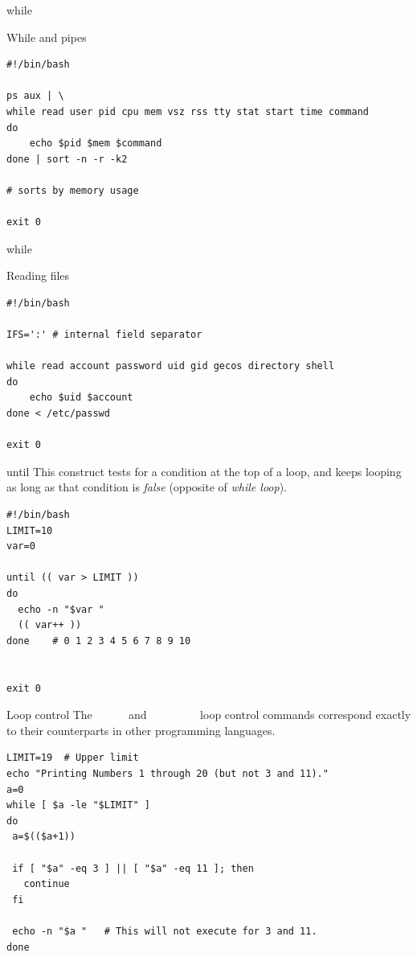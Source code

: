 \documentclass[xcolor=dvipsnames, 10pt, presentation,aspectratio=169]{beamer}
\newcommand{\bashcmd}[1]{\textcolor{White}{\colorbox{Sepia}{\texttt{#1}}}}
\begin{document}
\begin{frame}[label={sec:org631e4e6},fragile]{while}
 \begin{block}{While and pipes}
\begin{verbatim}
#!/bin/bash

ps aux | \
while read user pid cpu mem vsz rss tty stat start time command
do
    echo $pid $mem $command
done | sort -n -r -k2

# sorts by memory usage

exit 0
\end{verbatim}
\end{block}
\end{frame}
\begin{frame}[label={sec:orgd2531e5},fragile]{while}
 \begin{block}{Reading files}
\begin{verbatim}
#!/bin/bash

IFS=':' # internal field separator

while read account password uid gid gecos directory shell
do
    echo $uid $account
done < /etc/passwd

exit 0
\end{verbatim}
\end{block}
\end{frame}
\begin{frame}[label={sec:org83d089f},fragile]{until}
 This construct tests for a condition at the top of a loop, and keeps
looping as long as that condition is \emph{false} (opposite of \emph{while loop}).
\begin{block}{}
\begin{verbatim}
#!/bin/bash
LIMIT=10
var=0

until (( var > LIMIT ))
do
  echo -n "$var "
  (( var++ ))
done    # 0 1 2 3 4 5 6 7 8 9 10 


exit 0
\end{verbatim}
\end{block}
\end{frame}
\begin{frame}[label={sec:orgcaa410f},fragile]{Loop control}
 The \bashcmd{break} and \bashcmd{continue} loop control commands
correspond exactly to their counterparts in other programming
languages.
\begin{block}{}
\begin{verbatim}
LIMIT=19  # Upper limit
echo "Printing Numbers 1 through 20 (but not 3 and 11)."
a=0
while [ $a -le "$LIMIT" ]
do
 a=$(($a+1))

 if [ "$a" -eq 3 ] || [ "$a" -eq 11 ]; then
   continue
 fi

 echo -n "$a "   # This will not execute for 3 and 11.
done 
\end{verbatim}
\end{block}
\end{frame}
\end{document}
